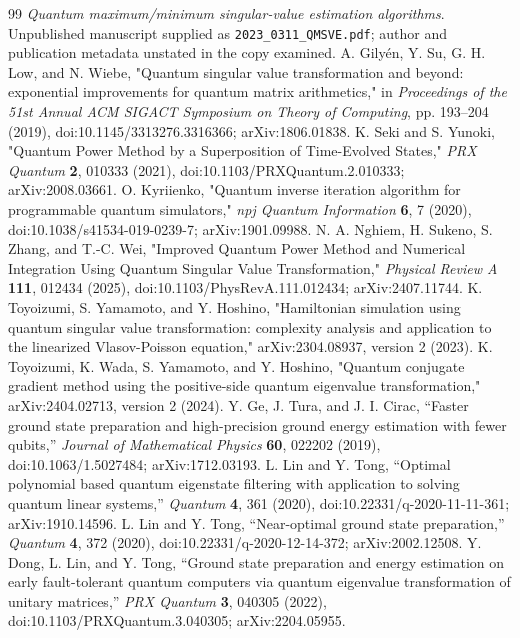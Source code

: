 \documentclass[11pt,a4paper]{article}
\begin{document}
{\begin{thebibliography}{99}
 \emph{Quantum maximum/minimum singular-value estimation algorithms}. Unpublished manuscript supplied as \texttt{2023\_0311\_QMSVE.pdf}; author and publication metadata unstated in the copy examined.
 A. Gily\'en, Y. Su, G. H. Low, and N. Wiebe, "Quantum singular value transformation and beyond: exponential improvements for quantum matrix arithmetics," in \emph{Proceedings of the 51st Annual ACM SIGACT Symposium on Theory of Computing}, pp. 193--204 (2019), doi:10.1145/3313276.3316366; arXiv:1806.01838.
 K. Seki and S. Yunoki, "Quantum Power Method by a Superposition of Time-Evolved States," \emph{PRX Quantum} \textbf{2}, 010333 (2021), doi:10.1103/PRXQuantum.2.010333; arXiv:2008.03661.
 O. Kyriienko, "Quantum inverse iteration algorithm for programmable quantum simulators," \emph{npj Quantum Information} \textbf{6}, 7 (2020), doi:10.1038/s41534-019-0239-7; arXiv:1901.09988.
 N. A. Nghiem, H. Sukeno, S. Zhang, and T.-C. Wei, "Improved Quantum Power Method and Numerical Integration Using Quantum Singular Value Transformation," \emph{Physical Review A} \textbf{111}, 012434 (2025), doi:10.1103/PhysRevA.111.012434; arXiv:2407.11744.
 K. Toyoizumi, S. Yamamoto, and Y. Hoshino, "Hamiltonian simulation using quantum singular value transformation: complexity analysis and application to the linearized Vlasov-Poisson equation," arXiv:2304.08937, version 2 (2023).
 K. Toyoizumi, K. Wada, S. Yamamoto, and Y. Hoshino, "Quantum conjugate gradient method using the positive-side quantum eigenvalue transformation," arXiv:2404.02713, version 2 (2024).
 Y. Ge, J. Tura, and J. I. Cirac, ``Faster ground state preparation and high-precision ground energy estimation with fewer qubits,'' \emph{Journal of Mathematical Physics} \textbf{60}, 022202 (2019), doi:10.1063/1.5027484; arXiv:1712.03193.
 L. Lin and Y. Tong, ``Optimal polynomial based quantum eigenstate filtering with application to solving quantum linear systems,'' \emph{Quantum} \textbf{4}, 361 (2020), doi:10.22331/q-2020-11-11-361; arXiv:1910.14596.
 L. Lin and Y. Tong, ``Near-optimal ground state preparation,'' \emph{Quantum} \textbf{4}, 372 (2020), doi:10.22331/q-2020-12-14-372; arXiv:2002.12508.
 Y. Dong, L. Lin, and Y. Tong, ``Ground state preparation and energy estimation on early fault-tolerant quantum computers via quantum eigenvalue transformation of unitary matrices,'' \emph{PRX Quantum} \textbf{3}, 040305 (2022), doi:10.1103/PRXQuantum.3.040305; arXiv:2204.05955.

\end{thebibliography}}
\end{document}
